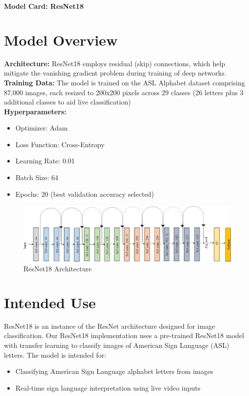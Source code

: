 \documentclass[12pt, a4paper]{article}
\begin{document}
\begin{center}
    \Large\textbf{Model Card: ResNet18}\\[0.3cm]
\end{center}

\section{Model Overview}
\textbf{Architecture:} ResNet18 employs residual (skip) connections, which help mitigate the vanishing gradient problem during training of deep networks.\\[0.3cm]
\textbf{Training Data:} The model is trained on the ASL Alphabet dataset comprising 87,000 images, each resized to 200x200 pixels across 29 classes (26 letters plus 3 additional classes to aid live classification)\\[0.3cm]
\textbf{Hyperparameters:}
\begin{itemize}
    \item Optimizer: Adam
    \item Loss Function: Cross-Entropy
    \item Learning Rate: 0.01
    \item Batch Size: 64
    \item Epochs: 20 (best validation accuracy selected)
\end{itemize}
\begin{figure}[H]
    \centering
    \includegraphics[width=\textwidth]{../../plots/Original-ResNet-18-Architecture.png}
    \caption{ResNet18 Architecture  \cite{deep_learning_alzheimers}}
    \label{fig:resnet18_architecture}
\end{figure}
\section{Intended Use}
ResNet18 is an instance of the ResNet architecture designed for image classification. Our ResNet18 implementation uses a pre-trained ResNet18 model with transfer learning to classify images of American Sign Language (ASL) letters. The model is intended for:
\begin{itemize}
    \item Classifying American Sign Language alphabet letters from images
    \item Real-time sign language interpretation using live video inputs
\end{itemize}
\end{document}

